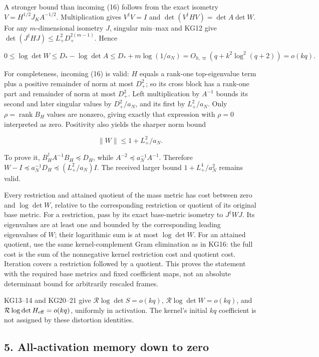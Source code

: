 \documentclass[11pt]{article}
\begin{document}
A stronger bound than incoming (16) follows from the exact isometry \(V=H^{1/2}J_KA^{-1/2}\). Multiplication gives \(V^\dagger V=I\) and \(\det(V^\dagger HV)=\det A\det W\). For any \(m\)-dimensional isometry \(J\), singular min--max and KG12 give \(\det(J^\dagger HJ)\le L_+^2D_+^{2(m-1)}\). Hence

\[
\boxed{0\le\log\det W\le D_* -\log\det A\le D_*+m\log(1/a_N)
=O_{h,\varpi}(q+k^2\log^2(q+2))=o(kq).}
\tag{KG21}
\]

For completeness, incoming (16) is valid: \(H\) equals a rank-one top-eigenvalue term plus a positive remainder of norm at most \(D_+^2\); so its cross block has a rank-one part and remainder of norm at most \(D_+^2\). Left multiplication by \(A^{-1}\) bounds its second and later singular values by \(D_+^2/a_N\), and its first by \(L_+^2/a_N\). Only \(\rho=\operatorname{rank}B_H\) values are nonzero, giving exactly that expression with \(\rho=0\) interpreted as zero. Positivity also yields the sharper norm bound

\[
\boxed{\|W\|\le1+L_+^2/a_N.}
\tag{KG22}
\]

To prove it, \(B_H^\dagger A^{-1}B_H\preceq D_H\), while \(A^{-2}\preceq a_N^{-1}A^{-1}\). Therefore \(W-I\preceq a_N^{-1}D_H\preceq (L_+^2/a_N)I\). The received larger bound \(1+L_+^4/a_N^2\) remains valid.

Every restriction and attained quotient of the mass metric has cost between zero and \(\log\det W\), relative to the corresponding restriction or quotient of its original base metric. For a restriction, pass by its exact base-metric isometry to \(J^\dagger WJ\). Its eigenvalues are at least one and bounded by the corresponding leading eigenvalues of \(W\); their logarithmic sum is at most \(\log\det W\). For an attained quotient, use the same kernel-complement Gram elimination as in KG16: the full cost is the sum of the nonnegative kernel restriction cost and quotient cost. Iteration covers a restriction followed by a quotient. This proves the statement with the required base metrics and fixed coefficient maps, not an absolute determinant bound for arbitrarily rescaled frames.

KG13--14 and KG20--21 give \(\mathcal R\log\det S=o(kq)\), \(\mathcal R\log\det W=o(kq)\), and \(\mathcal R\log\det H_{\rm eff}=o(kq)\), uniformly in activation. The kernel's initial \(kq\) coefficient is not assigned by these distortion identities.

\subsection{5. All-activation memory down to zero}\label{all-activation-memory-down-to-zero}
\end{document}
